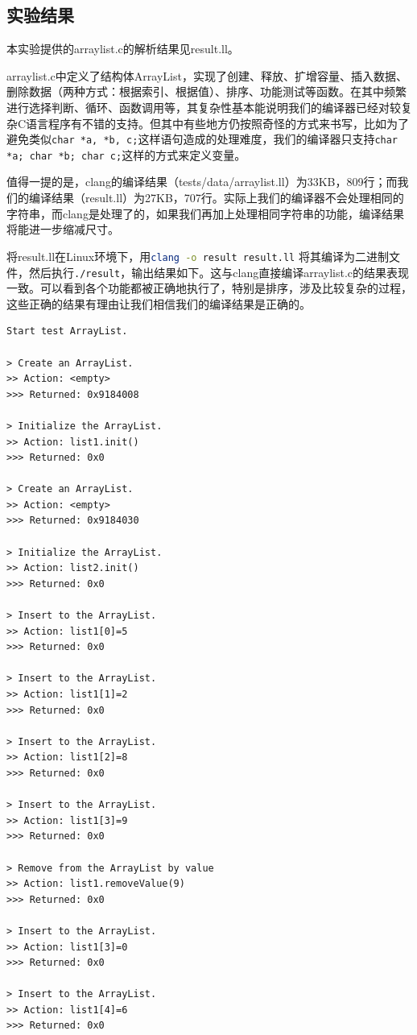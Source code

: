 \documentclass[a4paper]{article}
\begin{document}
\begin{CJK*}{UTF8}{gbsn}
    \section{实验结果}
    本实验提供的arraylist.c的解析结果见result.ll。
    \par arraylist.c中定义了结构体ArrayList，实现了创建、释放、扩增容量、插入数据、删除数据（两种方式：根据索引、根据值）、排序、功能测试等函数。在其中频繁进行选择判断、循环、函数调用等，其复杂性基本能说明我们的编译器已经对较复杂C语言程序有不错的支持。但其中有些地方仍按照奇怪的方式来书写，比如为了避免类似\lstinline{char *a, *b, c;}这样语句造成的处理难度，我们的编译器只支持\lstinline{char *a; char *b; char c;}这样的方式来定义变量。
    \par 值得一提的是，clang的编译结果（tests/data/arraylist.ll）为33KB，809行；而我们的编译结果（result.ll）为27KB，707行。实际上我们的编译器不会处理相同的字符串，而clang是处理了的，如果我们再加上处理相同字符串的功能，编译结果将能进一步缩减尺寸。
    \par 将result.ll在Linux环境下，用\lstinline[language=sh]{clang -o result result.ll} 将其编译为二进制文件，然后执行\lstinline[language=sh]{./result}，输出结果如下。这与clang直接编译arraylist.c的结果表现一致。可以看到各个功能都被正确地执行了，特别是排序，涉及比较复杂的过程，这些正确的结果有理由让我们相信我们的编译结果是正确的。
    \begin{verbatim}
Start test ArrayList.

> Create an ArrayList.
>> Action: <empty>
>>> Returned: 0x9184008

> Initialize the ArrayList.
>> Action: list1.init()
>>> Returned: 0x0

> Create an ArrayList.
>> Action: <empty>
>>> Returned: 0x9184030

> Initialize the ArrayList.
>> Action: list2.init()
>>> Returned: 0x0

> Insert to the ArrayList.
>> Action: list1[0]=5
>>> Returned: 0x0

> Insert to the ArrayList.
>> Action: list1[1]=2
>>> Returned: 0x0

> Insert to the ArrayList.
>> Action: list1[2]=8
>>> Returned: 0x0

> Insert to the ArrayList.
>> Action: list1[3]=9
>>> Returned: 0x0

> Remove from the ArrayList by value
>> Action: list1.removeValue(9)
>>> Returned: 0x0

> Insert to the ArrayList.
>> Action: list1[3]=0
>>> Returned: 0x0

> Insert to the ArrayList.
>> Action: list1[4]=6
>>> Returned: 0x0


\end{verbatim}
\end{CJK*}
\end{document}
